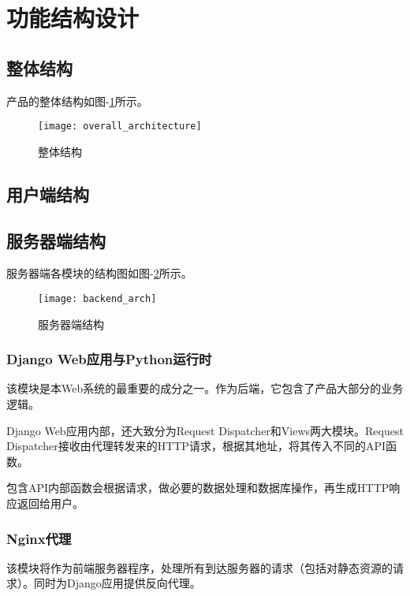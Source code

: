 \section{功能结构设计}
\subsection{整体结构}
产品的整体结构如图-\ref{fig:overall_architecture}所示。
\begin{figure}[h]
	\centering
	\texttt{[image: overall\_architecture]}
	\caption{整体结构} \label{fig:overall_architecture}
\end{figure}

\subsection{用户端结构}

\subsection{服务器端结构}
服务器端各模块的结构图如图-\ref{fig:backend_architecture}所示。
\begin{figure}[h]
	\centering
	\texttt{[image: backend\_arch]}
	\caption{服务器端结构} \label{fig:backend_architecture}
\end{figure}
\subsubsection{Django Web应用与Python运行时}
该模块是本Web系统的最重要的成分之一。作为后端，它包含了产品大部分的业务逻辑。

Django Web应用内部，还大致分为Request Dispatcher和Views两大模块。Request Dispatcher接收由代理转发来的HTTP请求，根据其地址，将其传入不同的API函数。

包含API内部函数会根据请求，做必要的数据处理和数据库操作，再生成HTTP响应返回给用户。

\subsubsection{Nginx代理}
该模块将作为前端服务器程序，处理所有到达服务器的请求（包括对静态资源的请求）。同时为Django应用提供反向代理。

